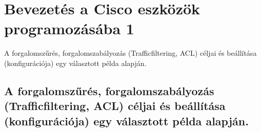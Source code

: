 \section{Bevezetés a Cisco eszközök programozásába 1}
{\footnotesize A forgalomszűrés, forgalomszabályozás (Trafficfiltering, ACL) céljai és beállítása (konfigurációja) egy választott példa alapján.}
\subsection{A forgalomszűrés, forgalomszabályozás (Trafficfiltering, ACL) céljai és beállítása (konfigurációja) egy választott példa alapján.}
